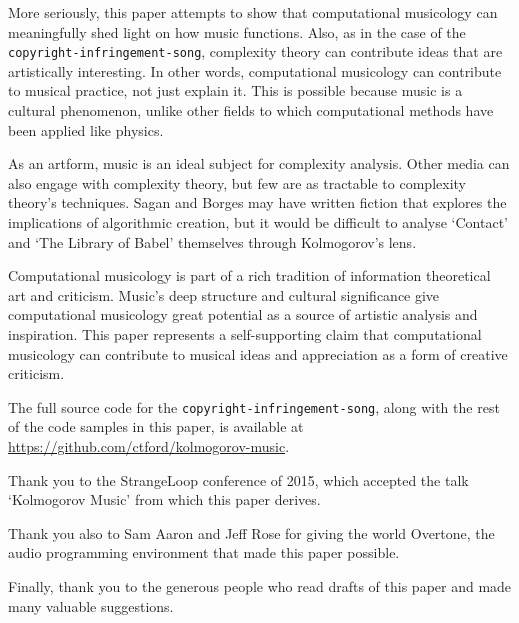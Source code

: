 \documentclass[numbers]{sigplanconf}
\begin{document}
More seriously, this paper attempts to show that computational musicology can meaningfully shed light on how music functions.
Also, as in
the case of the \verb|copyright-infringement-song|, complexity theory can contribute ideas that are artistically interesting.
In other words, computational musicology can contribute to musical practice, not just explain it. This is possible because music
is a cultural phenomenon, unlike other fields to which computational methods have been applied like physics.

As an artform, music is an ideal subject for complexity analysis. Other media can also engage with complexity theory, but
few are as tractable to complexity theory's techniques. Sagan and Borges may have written fiction that explores the implications
of algorithmic creation, but it would be difficult to analyse `Contact' and `The Library of Babel' themselves through
Kolmogorov's lens.

Computational musicology is part of a rich tradition of information theoretical art and criticism. Music's deep structure and
cultural significance give computational musicology great potential as a source of artistic analysis and inspiration.
This paper represents a self-supporting claim that computational musicology can contribute to musical ideas and appreciation as
a form of creative criticism.

The full source code for the \verb|copyright-infringement-song|, along with the rest of the code samples in this paper, is
available at \url{https://github.com/ctford/kolmogorov-music}.

\acks

Thank you to the StrangeLoop conference of 2015, which accepted the talk `Kolmogorov Music' from which this paper derives.

Thank you also to Sam Aaron and Jeff Rose for giving the world Overtone\cite{Overtone}, the audio programming environment
that made this paper possible.

Finally, thank you to the generous people who read drafts of this paper and made many valuable suggestions.



\end{document}
